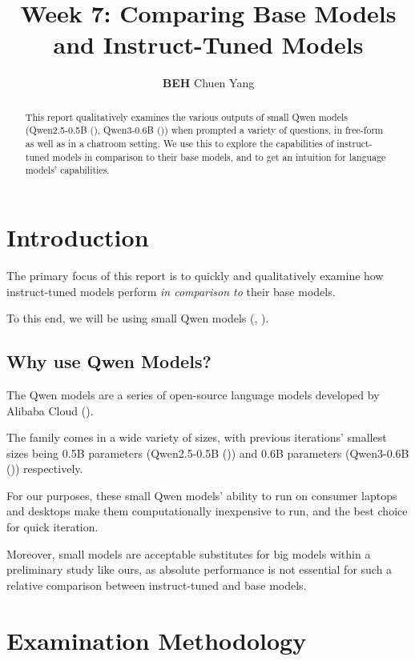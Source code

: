\documentclass{article} %
\title{Week 7: Comparing Base Models and Instruct-Tuned Models}
\author{\textbf{BEH} Chuen Yang}
\begin{document}
\ifcolmsubmission
\linenumbers
\fi

\maketitle

\begin{abstract}
    This report qualitatively examines the various outputs of small Qwen models
    (Qwen2.5-0.5B (\cite{Qwen-et-al-2025a}), Qwen3-0.6B (\cite{Qwen-et-al-2025b}))
    when prompted a variety of questions, in free-form
    as well as in a chatroom setting. We use this to explore the capabilities of instruct-tuned models
    in comparison to their base models, and to get an intuition for language models' capabilities.
\end{abstract}

\section{Introduction}

The primary focus of this report is to quickly and qualitatively examine how instruct-tuned models
perform \textit{in comparison to} their base models.

To this end, we will be using small Qwen models (\cite{Qwen-et-al-2025a}, \cite{Qwen-et-al-2025b}).

\subsection{Why use Qwen Models?}

The Qwen models are a series of open-source language models developed by Alibaba Cloud (\cite{Reuters-2025}).

The family comes in a wide variety of sizes, with previous iterations' smallest sizes
being 0.5B parameters (Qwen2.5-0.5B (\cite{Qwen-et-al-2025a})) and 0.6B parameters (Qwen3-0.6B (\cite{Qwen-et-al-2025b}))
respectively.

For our purposes, these small Qwen models' ability to run on consumer laptops and desktops 
make them computationally inexpensive to run, and the best choice for quick iteration.

Moreover, small models are acceptable substitutes for big models within a preliminary study like ours,
as absolute performance is not essential for such a relative comparison between instruct-tuned and base models.

\section{Examination Methodology}
\end{document}
